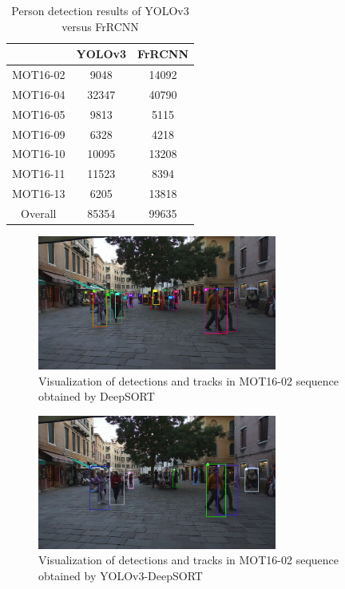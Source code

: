 \begin{table}[H]
\begin{center}
    \begin{tabular}{|| c | c | c ||} 
    \hline
    & YOLOv3\cite{yolov3} & FrRCNN \cite{Wojke2017simple}  \\
    \hline
    \hline
    MOT16-02 & 9048 & 14092\\
    \hline
    MOT16-04 & 32347 & 40790\\
    \hline
    MOT16-05 & 9813 & 5115 \\
    \hline
    MOT16-09 & 6328 & 4218 \\
    \hline
    MOT16-10 & 10095 & 13208\\
    \hline
    MOT16-11 & 11523 & 8394\\
    \hline
    MOT16-13 & 6205 & 13818\\
    \hline
    Overall & 85354 & 99635 \\
    \hline

\end{tabular}
\end{center}
    \caption{Person detection results of YOLOv3 versus FrRCNN}
    \label{tab:detections_results}
\end{table}\pagebreak
\begin{figure}[h!]
    \centering
    \includegraphics[width=0.7\textwidth]{Chapters/Fig/mot02_org_1.jpg}
    \caption{Visualization of detections and tracks in MOT16-02 sequence obtained by DeepSORT\cite{Wojke2017simple}}
    \label{fig:mot02_org_1}
\end{figure}

\begin{figure}[h!]
    \centering
    \includegraphics[width=0.7\textwidth]{Chapters/Fig/mot02_yolo_1.jpg}
    \caption{Visualization of detections and tracks in MOT16-02 sequence obtained by YOLOv3-DeepSORT}
    \label{fig:mot02_yolo_1}
\end{figure}

